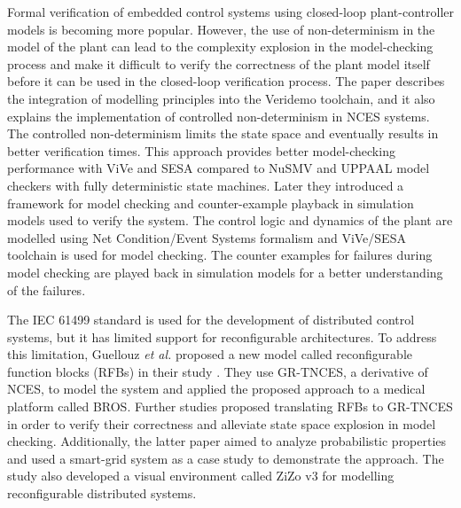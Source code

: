 \begin{bibunit}
Formal verification of embedded control systems using closed-loop plant-controller models is becoming more popular.  However, the use of non-determinism in the model of the plant can lead to the complexity explosion in the model-checking process and make it difficult to verify the correctness of the plant model itself before it can be used in the closed-loop verification process. The paper \cite{patil2011closed} describes the integration of modelling principles into the Veridemo toolchain, and it also explains the implementation of controlled non-determinism in NCES systems. The controlled non-determinism limits the state space and eventually results in better verification times. This approach provides better model-checking performance with ViVe and SESA compared to NuSMV and UPPAAL model checkers with fully deterministic state machines. Later they introduced \cite{patil2015counterexample}  a framework for model checking and counter-example playback in simulation models used to verify the system. The control logic and dynamics of the plant are modelled using Net Condition/Event Systems formalism and ViVe/SESA toolchain is used for model checking. The counter examples for failures during model checking are played back in simulation models for a better understanding of the failures.

The IEC 61499 standard is used for the development of distributed control systems, but it has limited support for reconfigurable architectures. To address this limitation, Guellouz \textit{et al.}  proposed a new model called reconfigurable function blocks (RFBs) in their study \cite{guellouz2016reconfigurable}. They use GR-TNCES, a derivative of NCES, to model the system and applied the proposed approach to a medical platform called BROS. Further studies \cite{guellouz2018designing, fkaier2021modeling} proposed translating RFBs to GR-TNCES in order to verify their correctness and alleviate state space explosion in model checking. Additionally, the latter paper aimed to analyze probabilistic properties and used a smart-grid system as a case study to demonstrate the approach. The study also developed a visual environment called ZiZo v3 for modelling reconfigurable distributed systems.


\end{bibunit}
